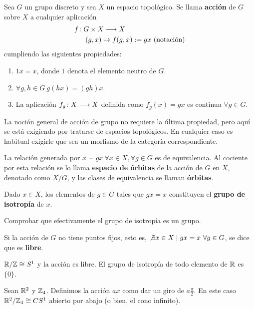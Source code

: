 \documentclass[GTS.tex]{subfiles}
\begin{document}
\begin{defi} Sea $G$ un grupo discreto y sea $X$ un espacio topológico. Se llama \textbf{acción} de $G$ sobre $X$ a cualquier aplicación 
\begin{align*}
f&\colon{G\times X}\longrightarrow{X}\\
&\quad (g,x)\mapsto f(g,x):=gx\ \text{(notaci\'on)}
\end{align*}
cumpliendo las siguientes propiedades:
\begin{enumerate}
\item $1x=x$, donde $1$ denota el elemento neutro de $G$.
\item $\forall g,h\in G\ g(hx)=(gh)x$.
\item La aplicación $f_g\colon{X}\longrightarrow{X}$ definida como $f_g(x)=gx$ es continua $\forall g\in G$. 
\end{enumerate}

\end{defi}

\begin{nota}
La noción general de acción de grupo no requiere la última propiedad, pero aquí se está exigiendo por tratarse de espacios topológicos. En cualquier caso es habitual exigirle que sea un morfismo de la categoría correspondiente.
\end{nota}

\begin{prop}
La relación generada por $x\sim gx\ \forall x\in X, \forall g\in G$ es de equivalencia. Al cociente por esta relación se lo llama \textbf{espacio de órbitas} de la acción de $G$ en $X$, denotado como $X/G$, y las clases de equivalencia se llaman \textbf{órbitas}.
\end{prop}

\begin{defi} Dado $x\in X$, los elementos de $g\in G$ tales que $gx=x$ constituyen el \textbf{grupo de isotropía} de $x$.
\end{defi}
\begin{ejer} Comprobar que efectivamente el grupo de isotropía es un grupo.
\end{ejer}

\begin{defi} Si la acción de $G$ no tiene puntos fijos, esto es, $\not\exists x\in X\mid gx=x\ \forall g\in G$, se dice que es \textbf{libre}.
\end{defi}

\begin{ej} $\mathbb{R}/\mathbb{Z}\cong S^1$ y la acción es libre. El grupo de isotropía de todo elemento de $\mathbb{R}$ es $\{0\}$.
\end{ej}

\begin{ej} Sean $\mathbb{R}^2$ y $\mathbb{Z}_4$. Definimos la acción $ax$ como dar un giro de $a\frac{\pi}{2}$. En este caso $\mathbb{R}^2/\mathbb{Z}_4\cong CS^1$ abierto por abajo (o bien, el cono infinito).
\end{ej}
\end{document}
